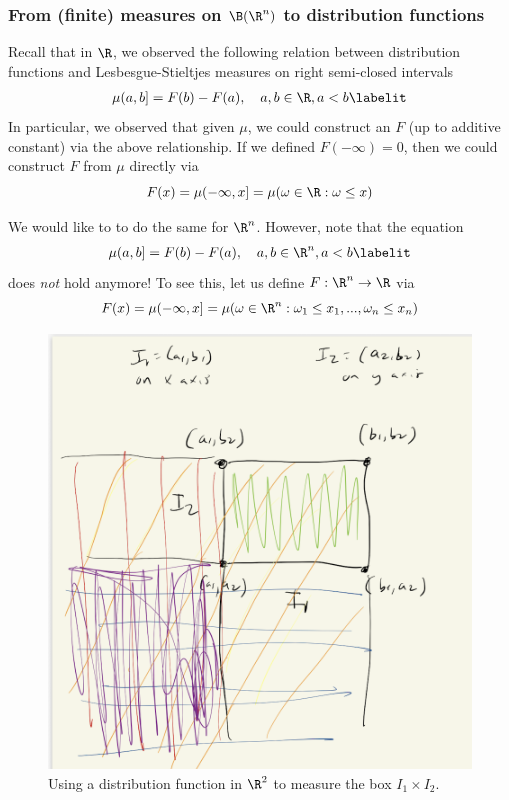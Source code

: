 \documentclass{article} %
\begin{document}

\subsubsection{From (finite) measures on $\B(\R^n)$ to distribution functions}
Recall that in $\R$, we observed the following relation between distribution functions  and Lesbesgue-Stieltjes measures on right semi-closed intervals 
\begin{align*}
\mu(a,b] = F(b) - F(a), \quad a,b \in \R, a<b 
\labelit \label{eqn:measure_as_distribution_function_difference_for_motivating_LS_in_Rn}
\end{align*}
In particular, we observed that given $\mu$, we could construct an $F$ (up to additive constant) via the above relationship.   If we defined $F(-\infty) = 0$, then we could construct $F$ from $\mu$ directly via 
\[ F(x)=\mu(-\infty, x] = \mu(\omega \in \R : \omega \leq x) \]

We would like to to do the same for $\R^n$.  However, note that the equation 
\begin{align*}
\mu(a,b] = F(b) - F(a), \quad a,b \in \R^n, a<b 	
\labelit \label{eqn:measure_as_distribution_function_difference_for_motivating_LS_in_Rn}
\end{align*}
does \textit{not} hold anymore! To see this, let us define  $F : \R^n \to \R$ via 
\[  F(x) = \mu(-\infty, x] = \mu(\omega \in \R^n : \omega_1 \leq x_1, ..., \omega_n \leq x_n)\]



\begin{figure}[H]
\centering
\includegraphics[width=.5\textwidth]{images/distribution_functions_in_Rn}	
\caption{Using a distribution function in $\R^2$ to measure the box $I_1 \times I_2$.}
\label{fig:distribution_functions_in_Rn}
\end{figure}
\end{document}
